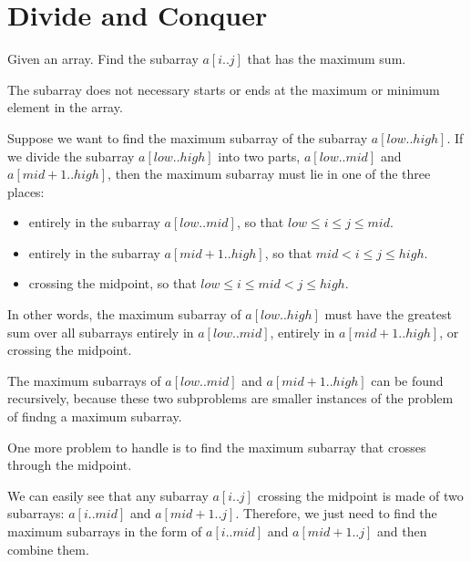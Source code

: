 \chapter{Divide and Conquer}

    \par Given an array. Find the subarray $a[i..j]$ that has the maximum
      sum.
    \par The subarray does not necessary starts or ends at the maximum or
      minimum element in the array.
    \par Suppose we want to find the maximum subarray of the subarray
      $a[low..high]$. If we divide the subarray $a[low..high]$ into two parts,
      $a[low..mid]$ and $a[mid + 1..high]$, then the maximum subarray must lie
      in one of the three places:
      \begin{itemize}
        \item entirely in the subarray $a[low..mid]$, so that
          $low \leq i \leq j \leq mid$.
        \item entirely in the subarray $a[mid + 1..high]$, so that
          $mid < i \leq j \leq high$.
        \item crossing the midpoint, so that $low \leq i \leq mid < j \leq high$.
      \end{itemize}
    \par In other words, the maximum subarray of $a[low..high]$ must have the
      greatest sum over all subarrays entirely in $a[low..mid]$, entirely in
      $a[mid + 1..high]$, or crossing the midpoint.
    \par The maximum subarrays of $a[low..mid]$ and $a[mid + 1..high]$ can
      be found recursively, because these two subproblems are smaller instances
      of the problem of findng a maximum subarray.
    \par One more problem to handle is to find the maximum subarray that
      crosses through the midpoint.
    \par We can easily see that any subarray $a[i..j]$ crossing the midpoint
      is made of two subarrays: $a[i..mid]$ and $a[mid + 1..j]$. Therefore, we
      just need to find the maximum subarrays in the form of $a[i..mid]$ and
      $a[mid + 1..j]$ and then combine them.
